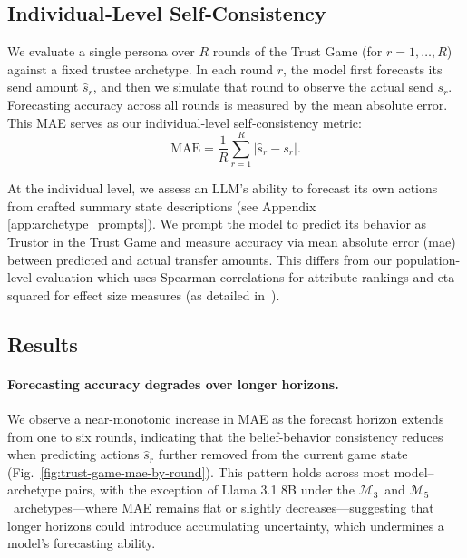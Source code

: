 \documentclass{article} %
\newcommand{\maxthreeusd}{$\mathcal{M}_3$\ }
\newcommand{\maxfiveusd}{$\mathcal{M}_5$\ }
\begin{document}
\subsection{Individual‐Level Self‐Consistency}
\label{subsec:ind-eval}


We evaluate a single persona over \(R\) rounds of the Trust Game (for \(r=1,\dots,R\)) against a fixed trustee archetype. In each round \(r\), the model first forecasts its send amount \(\hat s_r\), and then we simulate that round to observe the actual send \(s_r\). Forecasting accuracy across all rounds is measured by the mean absolute error. This MAE serves as our individual‐level self‐consistency metric:
\[
  \mathrm{MAE} = \frac{1}{R}\sum_{r=1}^R \bigl|\hat s_r - s_r\bigr|.
\]



At the individual level, we assess an LLM’s ability to forecast its own actions from crafted summary state descriptions (see Appendix \ref{app:archetype_prompts}). We prompt the model to predict its behavior as Trustor in the Trust Game and measure accuracy via mean absolute error (\gls{mae}) between predicted and actual transfer amounts. This differs from our population-level evaluation which uses Spearman correlations for attribute rankings and eta-squared for effect size measures (as detailed in~). 

\subsection{Results}

\paragraph{Forecasting accuracy degrades over longer horizons.}
We observe a near-monotonic increase in MAE as the forecast horizon extends from one to six rounds, indicating that the belief-behavior consistency reduces when predicting actions $\hat s_r$ further removed from the current game state (Fig.~\ref{fig:trust-game-mae-by-round}). This pattern holds across most model–archetype pairs, with the exception of Llama 3.1 8B under the \maxthreeusd and \maxfiveusd archetypes—where MAE remains flat or slightly decreases—suggesting that longer horizons could introduce accumulating uncertainty, which undermines a model's forecasting ability.  
\end{document}
